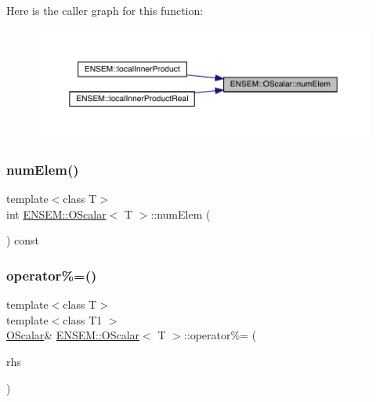 Here is the caller graph for this function\+:
\nopagebreak
\begin{figure}[H]
\begin{center}
\leavevmode
\includegraphics[width=350pt]{da/d80/classENSEM_1_1OScalar_aa9a7a2cddc34ba1add28369a764ced80_icgraph}
\end{center}
\end{figure}
\mbox{\label{classENSEM_1_1OScalar_aa9a7a2cddc34ba1add28369a764ced80}} 
\subsubsection{\texorpdfstring{numElem()}{numElem()}\hspace{0.1cm}{\footnotesize\ttfamily [3/3]}}
{\footnotesize\ttfamily template$<$class T$>$ \\
int \mbox{\hyperlink{classENSEM_1_1OScalar}{E\+N\+S\+E\+M\+::\+O\+Scalar}}$<$ T $>$\+::num\+Elem (\begin{DoxyParamCaption}{ }\end{DoxyParamCaption}) const\hspace{0.3cm}{\ttfamily [inline]}}

\mbox{\label{classENSEM_1_1OScalar_a89a76b1229e185250c0b9c48ae13d98b}} 
\subsubsection{\texorpdfstring{operator\%=()}{operator\%=()}\hspace{0.1cm}{\footnotesize\ttfamily [1/3]}}
{\footnotesize\ttfamily template$<$class T$>$ \\
template$<$class T1 $>$ \\
\mbox{\hyperlink{classENSEM_1_1OScalar}{O\+Scalar}}\& \mbox{\hyperlink{classENSEM_1_1OScalar}{E\+N\+S\+E\+M\+::\+O\+Scalar}}$<$ T $>$\+::operator\%= (\begin{DoxyParamCaption}\item[{const \mbox{\hyperlink{classENSEM_1_1OScalar}{O\+Scalar}}$<$ T1 $>$ \&}]{rhs }\end{DoxyParamCaption})\hspace{0.3cm}{\ttfamily [inline]}}



